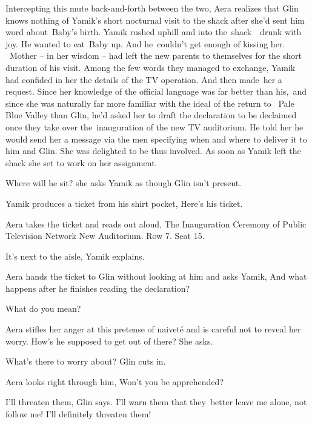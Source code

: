 \documentclass[twoside,11pt]{book}
\begin{document}
Intercepting this mute back-and-forth between the two, Aera realizes that Glin knows nothing of Yamik's short nocturnal
visit to the shack after she'd sent him word about\ Baby's birth. Yamik rushed uphill and into the\ shack\ \ drunk with
joy. He wanted to eat\ Baby up. And he{\ }couldn't get enough of kissing her. ~Mother -- in her wisdom
-- had left the new parents to themselves for the short duration of his visit. Among the few words they managed to
exchange, Yamik had confided in her the details of the TV operation. And then made\ her a request. Since her knowledge
of the official language was far better than his,\ and since she was naturally far more familiar with the ideal of the
return to \ Pale Blue Valley than Glin, he'd asked her to draft the declaration to be declaimed once they take over
the\ inauguration of the new TV auditorium. He told her he would send her a message via the men specifying when and
where to deliver it to him and Glin. She was delighted to be thus involved. As soon as Yamik left the shack she set to
work on her assignment{. }

{\textquotedbl}Where will he sit?{\textquotedbl} she asks Yamik as though Glin isn't present. 

Yamik produces a ticket from his shirt pocket, {\textquotedbl}Here's his ticket.{\textquotedbl} 

Aera takes the ticket and reads out aloud, {\textquotedbl}The Inauguration Ceremony of Public Television Network New
Auditorium. Row 7. Seat 15.{\textquotedbl} 

{\textquotedbl}It's next to the aisle,{\textquotedbl} Yamik explains. 

Aera hands the ticket to Glin without looking at him and asks Yamik, {\textquotedbl}And what happens after he finishes
reading the declaration?{\textquotedbl} 

{\textquotedbl}What do you mean?{\textquotedbl} 

Aera stifles her anger at this pretense of naivet\'e and is careful not to reveal her worry. {\textquotedbl}How's he
supposed to get out of there?{\textquotedbl} She asks.\ 

{\textquotedbl}What's there to worry about?{\textquotedbl} Glin cuts in{.}

Aera looks right through him, {\textquotedbl}Won't you be apprehended?{\textquotedbl} 

{\textquotedbl}I'll threaten them,{\textquotedbl} Glin says. {\textquotedbl}I'll warn them that they\ better leave me
alone, not follow me! I'll definitely threaten them!{\textquotedbl}
\end{document}
